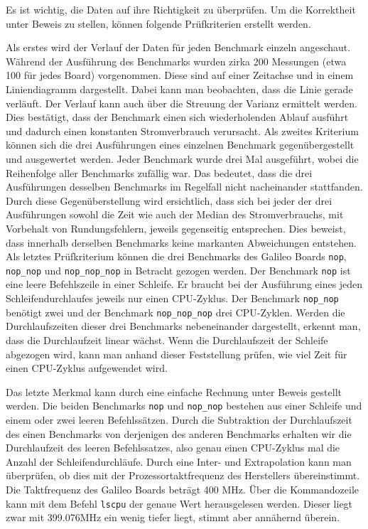 Es ist wichtig, die Daten auf ihre Richtigkeit zu überprüfen. Um die Korrektheit unter Beweis zu stellen, können folgende Prüfkriterien erstellt werden.
\par
Als erstes wird der Verlauf der Daten für jeden Benchmark einzeln angeschaut. Während der Ausführung des Benchmarks wurden zirka 200 Messungen (etwa 100 für jedes Board) vorgenommen. Diese sind auf einer Zeitachse und in einem Liniendiagramm dargestellt. Dabei kann man beobachten, dass die Linie gerade verläuft. Der Verlauf kann auch über die Streuung der Varianz ermittelt werden. Dies bestätigt, dass der Benchmark einen sich wiederholenden Ablauf ausführt und dadurch einen konstanten Stromverbrauch verursacht. Als zweites Kriterium können sich die drei Ausführungen eines einzelnen Benchmark gegenübergestellt und ausgewertet werden. Jeder Benchmark wurde drei Mal ausgeführt, wobei die Reihenfolge aller Benchmarks zufällig war. Das bedeutet, dass die drei Ausführungen desselben Benchmarks im Regelfall nicht nacheinander stattfanden. Durch diese Gegenüberstellung wird ersichtlich, dass sich bei jeder der drei Ausführungen sowohl die Zeit wie auch der Median des Stromverbrauchs, mit Vorbehalt von Rundungsfehlern, jeweils gegenseitig entsprechen. Dies beweist, dass innerhalb derselben Benchmarks keine markanten Abweichungen entstehen. Als letztes Prüfkriterium können die drei Benchmarks des Galileo Boards \texttt{nop}, \texttt{nop\_nop} und \texttt{nop\_nop\_nop} in Betracht gezogen werden. Der Benchmark \texttt{nop} ist eine leere Befehlszeile in einer Schleife. Er braucht bei der Ausführung eines jeden Schleifendurchlaufes jeweils nur einen CPU-Zyklus. Der Benchmark \texttt{nop\_nop} benötigt zwei und der Benchmark \texttt{nop\_nop\_nop} drei CPU-Zyklen. Werden die Durchlaufszeiten dieser drei Benchmarks nebeneinander dargestellt, erkennt man, dass die Durchlaufzeit linear wächst. Wenn die Durchlaufszeit der Schleife abgezogen wird, kann man anhand dieser Feststellung prüfen, wie viel Zeit für einen CPU-Zyklus aufgewendet wird.
\par
Das letzte Merkmal kann durch eine einfache Rechnung unter Beweis gestellt werden. Die beiden Benchmarks \texttt{nop} und \texttt{nop\_nop} bestehen aus einer Schleife und einem oder zwei leeren Befehlssätzen. Durch die Subtraktion der Durchlaufszeit des einen Benchmarks von derjenigen des anderen Benchmarks erhalten wir die Durchlaufzeit des leeren Befehlssatzes, also genau einen CPU-Zyklus mal die Anzahl der Schleifendurchläufe. Durch eine Inter- und Extrapolation kann man überprüfen, ob dies mit der Prozessortaktfrequenz des Herstellers übereinstimmt. Die Taktfrequenz des Galileo Boards beträgt 400 MHz. Über die Kommandozeile kann mit dem Befehl \texttt{lscpu} der genaue Wert herausgelesen werden. Dieser liegt zwar mit 399.076MHz ein wenig tiefer liegt, stimmt aber annähernd überein.

